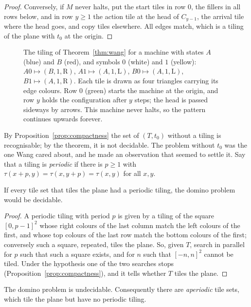 \begin{proof}
Conversely, if $M$ never halts, put the start tiles in row $0$, the fillers in all rows below, and in row $y\ge1$ the action tile at the head of $C_{y-1}$, the arrival tile where the head goes, and copy tiles elsewhere. All edges match, which is a tiling of the plane with $t_0$ at the origin.
\end{proof}

\begin{figure}[ht]
\centering
{}
\caption{The tiling of Theorem~\ref{thm:wang} for a machine with states $A$ (blue) and $B$ (red), and symbols $0$ (white) and $1$ (yellow): $A0\mapsto(B,1,\mathrm R)$, $A1\mapsto(A,1,\mathrm L)$, $B0\mapsto(A,1,\mathrm L)$, $B1\mapsto(A,1,\mathrm R)$. Each tile is drawn as four triangles carrying its edge colours. Row $0$ (green) starts the machine at the origin, and row $y$ holds the configuration after $y$ steps; the head is passed sideways by arrows. This machine never halts, so the pattern continues upwards forever.}
\label{fig:wang}
\end{figure}

By Proposition~\ref{prop:compactness} the set of $(T,t_0)$ without a tiling is recognisable; by the theorem, it is not decidable. The problem without $t_0$ was the one Wang cared about, and he made an observation that seemed to settle it. Say that a tiling is \emph{periodic} if there is $p\ge1$ with $\tau(x+p,y)=\tau(x,y+p)=\tau(x,y)$ for all $x,y$.

\begin{proposition}[Wang, 1961]\label{prop:wangperiodic}
If every tile set that tiles the plane had a periodic tiling, the domino problem would be decidable.
\end{proposition}

\begin{proof}
A periodic tiling with period $p$ is given by a tiling of the square $[0,p-1]^2$ whose right colours of the last column match the left colours of the first, and whose top colours of the last row match the bottom colours of the first; conversely such a square, repeated, tiles the plane. So, given $T$, search in parallel for $p$ such that such a square exists, and for $n$ such that $[-n,n]^2$ cannot be tiled. Under the hypothesis one of the two searches stops (Proposition~\ref{prop:compactness}), and it tells whether $T$ tiles the plane.
\end{proof}

\begin{theorem}[Berger, 1966]\label{thm:berger}
The domino problem is undecidable. Consequently there are \emph{aperiodic} tile sets, which tile the plane but have no periodic tiling.
\end{theorem}

